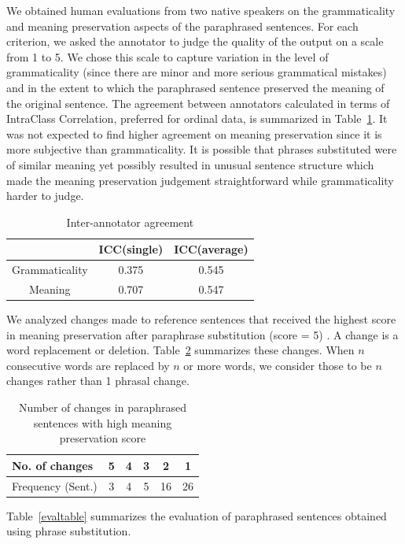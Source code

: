 \documentclass[11pt,letterpaper]{article}
\begin{document}
\noindent We obtained human evaluations from two native speakers on the grammaticality and  meaning preservation aspects of the paraphrased sentences. For each criterion, we asked the annotator to judge the quality of the output on a scale from 1 to 5. We chose this scale to capture variation in the level of grammaticality (since there are minor and more serious grammatical mistakes) and in the extent to which the paraphrased sentence preserved the meaning of the original sentence. The agreement between annotators calculated in terms of IntraClass Correlation, preferred for ordinal data, is summarized in Table~\ref{ann1}. It was not expected to find higher agreement on meaning preservation since it is more subjective than grammaticality. It is possible that phrases substituted were of similar meaning yet possibly resulted in unusual sentence structure which  made the meaning preservation judgement straightforward while grammaticality harder to judge. 
\begin{table}
\begin{tabular}{|c|c|c|}
\cline{2-3}
\multicolumn{1}{c|}{} & ICC(single) & ICC(average) \\
\hline
Grammaticality & 0.375 & 0.545\\
\hline
Meaning  & 0.707 & 0.547\\
\hline
\end{tabular}
\caption{Inter-annotator agreement}
\label{ann1}
\end{table}
We analyzed changes made to reference sentences that received the highest score in meaning preservation after paraphrase substitution (score = 5) . A change is a word replacement or deletion. Table~\ref{parasummary} summarizes these changes. When $n$ consecutive words are replaced by $n$ or more words, we consider those to be $n$ changes rather than 1 phrasal change. 
\begin{table}
\begin{center}
\begin{tabular}{|l||c|c|c|c|c|}
\hline
 No. of changes  & 5 & 4 & 3 & 2 & 1 \\
\hline
 Frequency (Sent.) & 3 & 4 & 5 & 16 & 26 \\
\hline
\end{tabular}
\caption{Number of changes in paraphrased sentences with high meaning preservation score\label{parasummary}}
\end{center}
\end{table}
Table~\ref{evaltable} summarizes the evaluation of paraphrased sentences obtained using phrase substitution.
\end{document}
